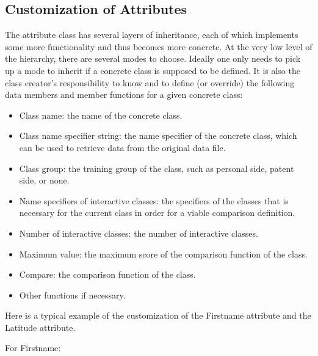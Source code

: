 \documentclass{article}
\begin{document}
\subsection{Customization of Attributes}


The attribute class has several layers of inheritance, 
each of which implements some more functionality and thus 
becomes more concrete. At the  very low level of the 
hierarchy, there are several modes to choose. Ideally one 
only needs to pick up a mode to inherit if a concrete class 
is supposed to be defined. It is also the class creator's 
responsibility to know and to define (or override) the 
following data members and member functions for a 
given concrete class:

\begin{itemize}

\item Class name: the name of the concrete class.

\item Class name specifier string: the name specifier
of the concrete class, which can be used to
retrieve data from the original data file.

\item Class group: the training group of the class, 
such as personal side, patent side, or none.

\item Name specifiers of interactive classes: the 
specifiers of the classes that is necessary for the
current class in order for a viable comparison definition.

\item Number of interactive classes: the number of 
interactive classes.

\item Maximum value: the maximum score of the comparison 
function of the class.

\item Compare: the comparison function of the class.

\item Other functions if necessary.

\end{itemize}

Here is a typical example of the customization of the 
Firstname attribute and the Latitude attribute.

For Firstname:
\end{document}
